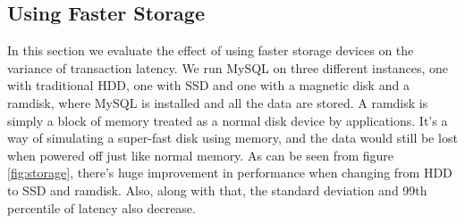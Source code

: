 \subsection{Using Faster Storage}
In this section we evaluate the effect of using faster storage devices on
the variance of transaction latency. We run MySQL on three different instances,
one with traditional HDD, one with SSD and one with a magnetic disk and a
ramdisk, where MySQL is installed and all the data are stored. A ramdisk is
simply a block of memory treated as a normal disk device by applications. It's
a way of simulating a super-fast disk using memory, and the data would still
be lost when powered off just like normal memory. As can be seen from figure
\ref{fig:storage}, there's huge improvement in performance when changing from
HDD to SSD and ramdisk. Also, along with that, the standard deviation and 99th
percentile of latency also decrease.

